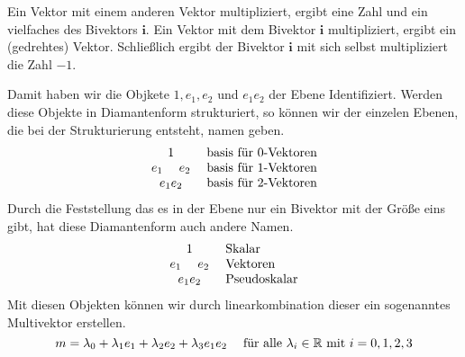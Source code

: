 \documentclass[fleqn]{scrartcl}
\numberwithin{equation}{section}
\def\*#1{\mathbf{#1}}
\begin{document}
Ein Vektor mit einem anderen Vektor multipliziert, ergibt eine Zahl und ein
vielfaches des Bivektors $\*i$. Ein Vektor mit dem Bivektor $\*i$
multipliziert, ergibt ein (gedrehtes) Vektor. Schließlich ergibt der Bivektor
$\*i$ mit sich selbst multipliziert die Zahl $-1$.

Damit haben wir die Objkete $1, e_1, e_2$ und $e_1e_2$ der Ebene
Identifiziert. Werden diese Objekte in Diamantenform strukturiert, so können
wir der einzelen Ebenen, die bei der Strukturierung entsteht, namen geben.
\[
\begin{matrix}
    1 \\ 
    e_1\hspace{3ex} e_2 \\ 
    e_1e_2
\end{matrix}
\hspace{3ex}
\begin{matrix*}[l]
    \textrm{basis für }0\textrm{-Vektoren} \\ 
    \textrm{basis für }1\textrm{-Vektoren} \\ 
    \textrm{basis für }2\textrm{-Vektoren}
\end{matrix*}
\]
Durch die Feststellung das es in der Ebene nur ein Bivektor mit der Größe eins
gibt, hat diese Diamantenform auch andere Namen.
\[
\begin{matrix}
    1 \\ 
    e_1\hspace{3ex} e_2 \\ 
    e_1e_2
\end{matrix}
\hspace{3ex}
\begin{matrix*}[l]
    \textrm{Skalar} \\ 
    \textrm{Vektoren} \\ 
    \textrm{Pseudoskalar}
\end{matrix*}
\]
Mit diesen Objekten können wir durch linearkombination dieser ein sogenanntes
Multivektor erstellen.
\[
    m = \lambda_0 + \lambda_1e_1 + \lambda_2e_2 +
    \lambda_3e_1e_2\hspace{3ex}\textrm{für alle
    }\lambda_i\in\mathbb{R}\textrm{ mit } i=0,1,2,3
\]
\end{document}
